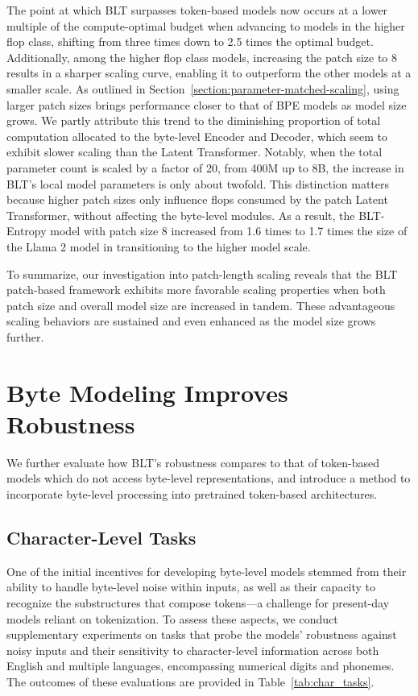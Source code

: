The point at which {\textsc BLT} surpasses token-based models now occurs at a lower multiple of the compute-optimal budget when advancing to models in the higher flop class, shifting from three times down to 2.5 times the optimal budget. Additionally, among the higher flop class models, increasing the patch size to 8 results in a sharper scaling curve, enabling it to outperform the other models at a smaller scale. As outlined in Section~\ref{section:parameter-matched-scaling}, using larger patch sizes brings performance closer to that of BPE models as model size grows. We partly attribute this trend to the diminishing proportion of total computation allocated to the byte-level Encoder and Decoder, which seem to exhibit slower scaling than the Latent Transformer. Notably, when the total parameter count is scaled by a factor of 20, from 400M up to 8B, the increase in {\textsc BLT}’s local model parameters is only about twofold. This distinction matters because higher patch sizes only influence flops consumed by the patch Latent Transformer, without affecting the byte-level modules. As a result, the {\textsc BLT}-Entropy model with patch size 8 increased from 1.6 times to 1.7 times the size of the Llama 2 model in transitioning to the higher model scale.

To summarize, our investigation into patch-length scaling reveals that the {\textsc BLT} patch-based framework exhibits more favorable scaling properties when both patch size and overall model size are increased in tandem. These advantageous scaling behaviors are sustained and even enhanced as the model size grows further.

\section{Byte Modeling Improves Robustness} We further evaluate how {\textsc BLT}'s robustness compares to that of token-based models which do not access byte-level representations, and introduce a method to incorporate byte-level processing into pretrained token-based architectures.
\label{sec:robustness}

\subsection{Character-Level Tasks}

One of the initial incentives for developing byte-level models stemmed from their ability to handle byte-level noise within inputs, as well as their capacity to recognize the substructures that compose tokens—a challenge for present-day models reliant on tokenization. To assess these aspects, we conduct supplementary experiments on tasks that probe the models’ robustness against noisy inputs and their sensitivity to character-level information across both English and multiple languages, encompassing numerical digits and phonemes. The outcomes of these evaluations are provided in Table~\ref{tab:char_tasks}.

